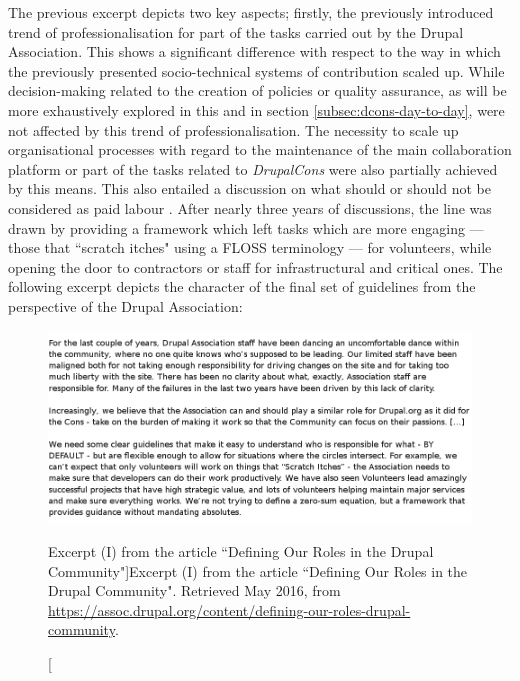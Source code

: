 The previous excerpt depicts two key aspects; firstly, the previously introduced trend of professionalisation for part of the tasks carried out by the Drupal Association. This shows a significant difference with respect to the way in which the previously presented socio-technical systems of contribution scaled up. While decision-making related to the creation of policies or quality assurance, as will be more exhaustively explored in this and in section \ref{subsec:dcons-day-to-day}, were not affected by this trend of professionalisation. The necessity to scale up organisational processes with regard to the maintenance of the main collaboration platform or part of the tasks related to \textit{DrupalCons} were also partially achieved by this means. This also entailed a discussion on what should or should not be considered as paid labour \parencite{drupal-volunteer-contractor:2016:Online}. After nearly three years of discussions, the line was drawn by providing a framework which left tasks which are more engaging --- those that ``scratch itches" using a FLOSS terminology --- for volunteers, while opening the door to contractors or staff for infrastructural and critical ones. The following excerpt depicts the character of the final set of guidelines from the perspective of the Drupal Association:

\begin{figure}[H]
  \centering
\includegraphics[width=\textwidth]{img/quotes_replacement/da_april2014.png}
\caption[Excerpt (I) from the article ``Defining Our Roles in the Drupal Community"]{Excerpt (I) from the article ``Defining Our Roles in the Drupal Community". Retrieved  May 2016, from \url{https://assoc.drupal.org/content/defining-our-roles-drupal-community}.}
\label{quote_da_defining_roles_01}
\end{figure}

